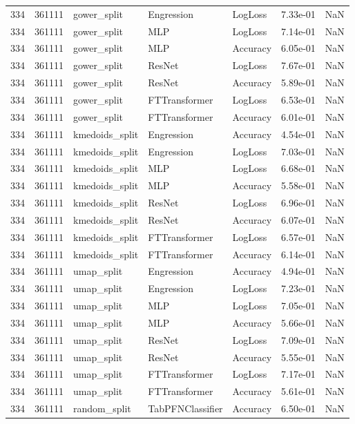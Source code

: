 \begin{tabular}{rrlllrr}
334 & 361111 & gower\_split & Engression & LogLoss & 7.33e-01 & NaN \\
334 & 361111 & gower\_split & MLP & LogLoss & 7.14e-01 & NaN \\
334 & 361111 & gower\_split & MLP & Accuracy & 6.05e-01 & NaN \\
334 & 361111 & gower\_split & ResNet & LogLoss & 7.67e-01 & NaN \\
334 & 361111 & gower\_split & ResNet & Accuracy & 5.89e-01 & NaN \\
334 & 361111 & gower\_split & FTTransformer & LogLoss & 6.53e-01 & NaN \\
334 & 361111 & gower\_split & FTTransformer & Accuracy & 6.01e-01 & NaN \\
334 & 361111 & kmedoids\_split & Engression & Accuracy & 4.54e-01 & NaN \\
334 & 361111 & kmedoids\_split & Engression & LogLoss & 7.03e-01 & NaN \\
334 & 361111 & kmedoids\_split & MLP & LogLoss & 6.68e-01 & NaN \\
334 & 361111 & kmedoids\_split & MLP & Accuracy & 5.58e-01 & NaN \\
334 & 361111 & kmedoids\_split & ResNet & LogLoss & 6.96e-01 & NaN \\
334 & 361111 & kmedoids\_split & ResNet & Accuracy & 6.07e-01 & NaN \\
334 & 361111 & kmedoids\_split & FTTransformer & LogLoss & 6.57e-01 & NaN \\
334 & 361111 & kmedoids\_split & FTTransformer & Accuracy & 6.14e-01 & NaN \\
334 & 361111 & umap\_split & Engression & Accuracy & 4.94e-01 & NaN \\
334 & 361111 & umap\_split & Engression & LogLoss & 7.23e-01 & NaN \\
334 & 361111 & umap\_split & MLP & LogLoss & 7.05e-01 & NaN \\
334 & 361111 & umap\_split & MLP & Accuracy & 5.66e-01 & NaN \\
334 & 361111 & umap\_split & ResNet & LogLoss & 7.09e-01 & NaN \\
334 & 361111 & umap\_split & ResNet & Accuracy & 5.55e-01 & NaN \\
334 & 361111 & umap\_split & FTTransformer & LogLoss & 7.17e-01 & NaN \\
334 & 361111 & umap\_split & FTTransformer & Accuracy & 5.61e-01 & NaN \\
334 & 361111 & random\_split & TabPFNClassifier & Accuracy & 6.50e-01 & NaN \\

\end{tabular}
